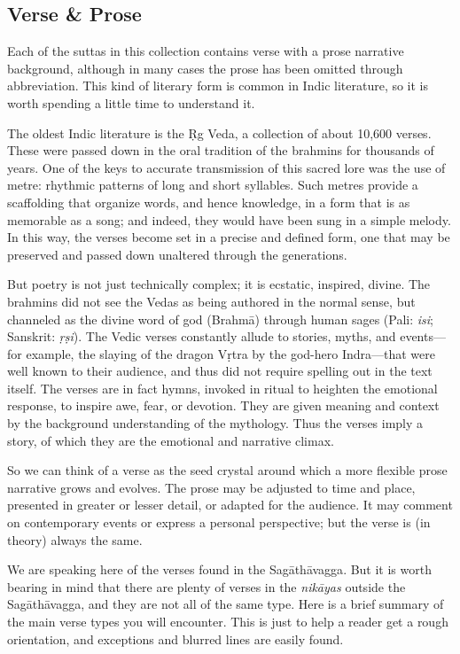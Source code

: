 \documentclass[12pt,openany]{book}%
\begin{document}
\subsection*{Verse \& Prose}

Each of the suttas in this collection contains verse with a prose narrative background, although in many cases the prose has been omitted through abbreviation. This kind of literary form is common in Indic literature, so it is worth spending a little time to understand it.

The oldest Indic literature is the Ṛg Veda, a collection of about 10,600 verses. These were passed down in the oral tradition of the brahmins for thousands of years. One of the keys to accurate transmission of this sacred lore was the use of metre: rhythmic patterns of long and short syllables. Such metres provide a scaffolding that organize words, and hence knowledge, in a form that is as memorable as a song; and indeed, they would have been sung in a simple melody. In this way, the verses become set in a precise and defined form, one that may be preserved and passed down unaltered through the generations.

But poetry is not just technically complex; it is ecstatic, inspired, divine. The brahmins did not see the Vedas as being authored in the normal sense, but channeled as the divine word of god (\textsanskrit{Brahmā}) through human sages (Pali: \textit{isi}; Sanskrit: \textit{\textsanskrit{ṛṣi}}). The Vedic verses constantly allude to stories, myths, and events—for example, the slaying of the dragon \textsanskrit{Vṛtra} by the god-hero Indra—that were well known to their audience, and thus did not require spelling out in the text itself. The verses are in fact hymns, invoked in ritual to heighten the emotional response, to inspire awe, fear, or devotion. They are given meaning and context by the background understanding of the mythology. Thus the verses imply a story, of which they are the emotional and narrative climax.

So we can think of a verse as the seed crystal around which a more flexible prose narrative grows and evolves. The prose may be adjusted to time and place, presented in greater or lesser detail, or adapted for the audience. It may comment on contemporary events or express a personal perspective; but the verse is (in theory) always the same.

We are speaking here of the verses found in the \textsanskrit{Sagāthāvagga}. But it is worth bearing in mind that there are plenty of verses in the \textit{\textsanskrit{nikāyas}} outside the \textsanskrit{Sagāthāvagga}, and they are not all of the same type. Here is a brief summary of the main verse types you will encounter. This is just to help a reader get a rough orientation, and exceptions and blurred lines are easily found.
\end{document}
